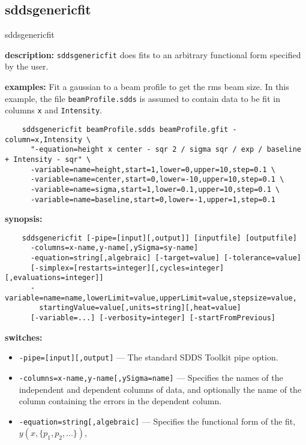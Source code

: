 \newpage
\subsection{sddsgenericfit}
\label{sddsgenericfit}

\begin{sddsprog}{sddsgenericfit}
  \item \textbf{description:} \verb|sddsgenericfit| does fits to an arbitrary functional form specified by the user.
  \item \textbf{examples:}
    Fit a gaussian to a beam profile to get the rms beam size. In this example, the
    file \verb|beamProfile.sdds| is assumed to contain data to be fit in columns
    \verb|x| and \verb|Intensity|.
    \begin{verbatim}
    sddsgenericfit beamProfile.sdds beamProfile.gfit -column=x,Intensity \
      "-equation=height x center - sqr 2 / sigma sqr / exp / baseline + Intensity - sqr" \
      -variable=name=height,start=1,lower=0,upper=10,step=0.1 \
      -variable=name=center,start=0,lower=-10,upper=10,step=0.1 \
      -variable=name=sigma,start=1,lower=0.1,upper=10,step=0.1 \
      -variable=name=baseline,start=0,lower=-1,upper=1,step=0.1
    \end{verbatim}
  \item \textbf{synopsis:}
    \begin{verbatim}
    sddsgenericfit [-pipe=[input][,output]] [inputfile] [outputfile]
      -columns=x-name,y-name[,ySigma=sy-name]
      -equation=string[,algebraic] [-target=value] [-tolerance=value]
      [-simplex=[restarts=integer][,cycles=integer][,evaluations=integer]]
      -variable=name=name,lowerLimit=value,upperLimit=value,stepsize=value,
        startingValue=value[,units=string][,heat=value]
      [-variable=...] [-verbosity=integer] [-startFromPrevious]
    \end{verbatim}
  \item \textbf{switches:}
    \begin{itemize}
      \item \verb|-pipe=[input][,output]| --- The standard SDDS Toolkit pipe option.
      \item \verb|-columns=x-name,y-name[,ySigma=name]| --- Specifies the names of the independent and dependent columns of data, and
        optionally the name of the column containing the errors in the dependent column.
      \item \verb|-equation=string[,algebraic]| --- Specifies the functional form of the fit, $y(x, \{p_1, p_2, ...\})$,

\end{itemize}
\end{sddsprog}

